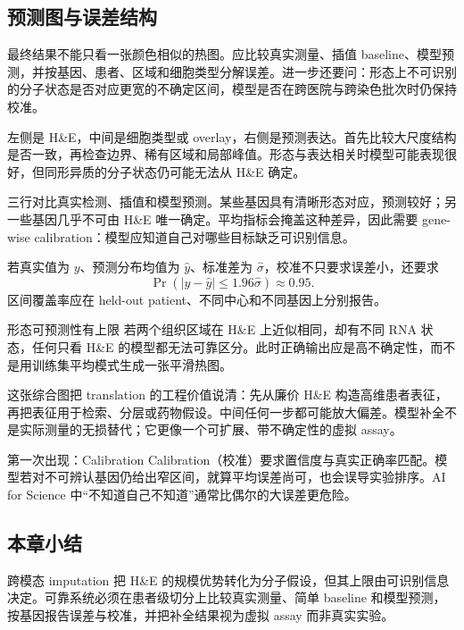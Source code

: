 \subsection{预测图与误差结构}

最终结果不能只看一张颜色相似的热图。应比较真实测量、插值 baseline、模型预测，并按基因、患者、区域和细胞类型分解误差。进一步还要问：形态上不可识别的分子状态是否对应更宽的不确定区间，模型是否在跨医院与跨染色批次时仍保持校准。


左侧是 H\&E，中间是细胞类型或 overlay，右侧是预测表达。首先比较大尺度结构是否一致，再检查边界、稀有区域和局部峰值。形态与表达相关时模型可能表现很好，但同形异质的分子状态仍可能无法从 H\&E 确定。


三行对比真实检测、插值和模型预测。某些基因具有清晰形态对应，预测较好；另一些基因几乎不可由 H\&E 唯一确定。平均指标会掩盖这种差异，因此需要 gene-wise calibration：模型应知道自己对哪些目标缺乏可识别信息。

若真实值为 $y$、预测分布均值为 $\hat y$、标准差为 $\hat\sigma$，校准不只要求误差小，还要求
\[
\Pr\left(|y-\hat y|\leq 1.96\hat\sigma\right)\approx 0.95.
\]
区间覆盖率应在 held-out patient、不同中心和不同基因上分别报告。

\begin{warningbox}{形态可预测性有上限}
若两个组织区域在 H\&E 上近似相同，却有不同 RNA 状态，任何只看 H\&E 的模型都无法可靠区分。此时正确输出应是高不确定性，而不是用训练集平均模式生成一张平滑热图。
\end{warningbox}


这张综合图把 translation 的工程价值说清：先从廉价 H\&E 构造高维患者表征，再把表征用于检索、分层或药物假设。中间任何一步都可能放大偏差。模型补全不是实际测量的无损替代；它更像一个可扩展、带不确定性的虚拟 assay。


\begin{knowledgebox}{第一次出现：Calibration}
Calibration（校准）要求置信度与真实正确率匹配。模型若对不可辨认基因仍给出窄区间，就算平均误差尚可，也会误导实验排序。AI for Science 中“不知道自己不知道”通常比偶尔的大误差更危险。
\end{knowledgebox}

\subsection{本章小结}

跨模态 imputation 把 H\&E 的规模优势转化为分子假设，但其上限由可识别信息决定。可靠系统必须在患者级切分上比较真实测量、简单 baseline 和模型预测，按基因报告误差与校准，并把补全结果视为虚拟 assay 而非真实实验。

